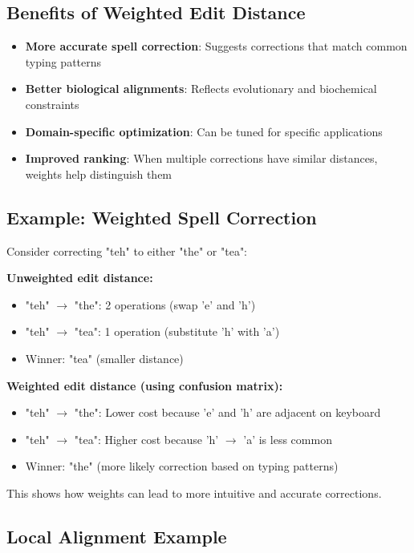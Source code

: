 \documentclass[11pt,a4paper]{article}
\theoremstyle{definition}
\theoremstyle{plain}
\theoremstyle{remark}
\begin{document}
\subsection{Benefits of Weighted Edit Distance}

\begin{itemize}
    \item \textbf{More accurate spell correction}: Suggests corrections that match common typing patterns
    \item \textbf{Better biological alignments}: Reflects evolutionary and biochemical constraints
    \item \textbf{Domain-specific optimization}: Can be tuned for specific applications
    \item \textbf{Improved ranking}: When multiple corrections have similar distances, weights help distinguish them
\end{itemize}

\subsection{Example: Weighted Spell Correction}

Consider correcting "teh" to either "the" or "tea":

\textbf{Unweighted edit distance:}
\begin{itemize}
    \item "teh" $\rightarrow$ "the": 2 operations (swap 'e' and 'h')
    \item "teh" $\rightarrow$ "tea": 1 operation (substitute 'h' with 'a')
    \item Winner: "tea" (smaller distance)
\end{itemize}

\textbf{Weighted edit distance (using confusion matrix):}
\begin{itemize}
    \item "teh" $\rightarrow$ "the": Lower cost because 'e' and 'h' are adjacent on keyboard
    \item "teh" $\rightarrow$ "tea": Higher cost because 'h' $\rightarrow$ 'a' is less common
    \item Winner: "the" (more likely correction based on typing patterns)
\end{itemize}

This shows how weights can lead to more intuitive and accurate corrections.

\subsection{Local Alignment Example}
\end{document}
